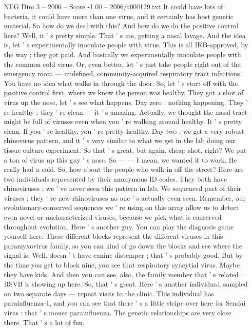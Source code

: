 \begin{textsample}{NEG Dim 3 – 2006 – Score -1.00 – 2006/t000129.txt}
It could have lots of bacteria, it could have more than one virus, and it certainly has host genetic material.
So how do we deal with this?
And how do we do the positive control here?
Well, it ' s pretty simple.
That ' s me, getting a nasal lavage.
And the idea is, let ' s experimentally inoculate people with virus.
This is all IRB-approved, by the way ; they got paid.
And basically we experimentally inoculate people with the common cold virus.
Or, even better, let ' s just take people right out of the emergency room — undefined, community-acquired respiratory tract infections.
You have no idea what walks in through the door.
So, let ' s start off with the positive control first, where we know the person was healthy.
They got a shot of virus up the nose, let ' s see what happens.
Day zero : nothing happening.
They ' re healthy ; they ' re clean — it ' s amazing.
Actually, we thought the nasal tract might be full of viruses even when you ' re walking around healthy.
It ' s pretty clean.
If you ' re healthy, you ' re pretty healthy.
Day two : we get a very robust rhinovirus pattern, and it ' s very similar to what we get in the lab doing our tissue culture experiment.
So that ' s great, but again, cheap shot, right?
We put a ton of virus up this guy ' s nose.
So — — I mean, we wanted it to work.
He really had a cold.
So, how about the people who walk in off the street?
Here are two individuals represented by their anonymous ID codes.
They both have rhinoviruses ; we ' ve never seen this pattern in lab.
We sequenced part of their viruses ; they ' re new rhinoviruses no one ' s actually even seen.
Remember, our evolutionary-conserved sequences we ' re using on this array allow us to detect even novel or uncharacterized viruses, because we pick what is conserved throughout evolution.
Here ' s another guy.
You can play the diagnosis game yourself here.
These different blocks represent the different viruses in this paramyxovirus family, so you can kind of go down the blocks and see where the signal is.
Well, doesn ' t have canine distemper ; that ' s probably good.
But by the time you get to block nine, you see that respiratory syncytial virus.
Maybe they have kids.
And then you can see, also, the family member that ' s related : RSVB is showing up here.
So, that ' s great.
Here ' s another individual, sampled on two separate days — repeat visits to the clinic.
This individual has parainfluenza-1, and you can see that there ' s a little stripe over here for Sendai virus : that ' s mouse parainfluenza.
The genetic relationships are very close there.
That ' s a lot of fun.

\end{textsample}
